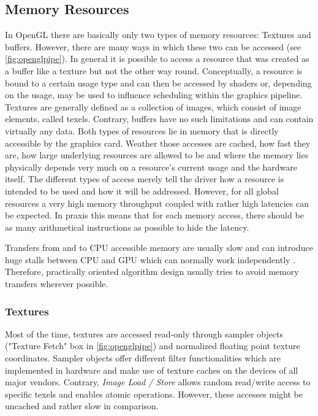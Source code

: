 \documentclass[thesis.tex]{subfiles}
\begin{document}
\subsection{Memory Resources} \label{sec:preq:memory}
In OpenGL there are basically only two types of memory resources: Textures and buffers.
However, there are many ways in which these two can be accessed (see \autoref{fig:openglpipe}).
In general it is possible to access a resource that was created as a buffer like a texture but not the other way round.
Conceptually, a resource is bound to a certain usage type and can then be accessed by shaders or, depending on the usage, may be used to influence scheduling within the graphics pipeline.
Textures are generally defined as a collection of images, which consist of image elements, called texels. %
Contrary, buffers have no such limitations and can contain virtually any data.
Both types of resources lie in memory that is directly accessible by the graphics card.
Weather those accesses are cached, how fast they are, how large underlying resources are allowed to be and where the memory lies physically depends very much on a resource's current usage and the hardware itself.
The different types of access merely tell the driver how a resource is intended to be used and how it will be addressed.
However, for all global resources a very high memory throughput coupled with rather high latencies can be expected.
In praxis this means that for each memory access, there should be as many arithmetical instructions as possible to hide the latency.

Transfers from and to CPU accessible memory are usually slow and can introduce huge stalls between CPU and GPU which can normally work independently \cite{bib:openglinsightstransfer}.
Therefore, practically oriented algorithm design usually tries to avoid memory transfers wherever possible.

\subsubsection{Textures}
Most of the time, textures are accessed read-only through sampler objects ("Texture Fetch" box in \autoref{fig:openglpipe}) and normalized floating point texture coordinates.
Sampler objects offer different filter functionalities which are implemented in hardware and make use of texture caches on the devices of all major vendors.
Contrary, \emph{Image Load / Store} allows random read/write access to specific texels and enables atomic operations.
However, these accesses might be uncached and rather slow in comparison.
\end{document}

